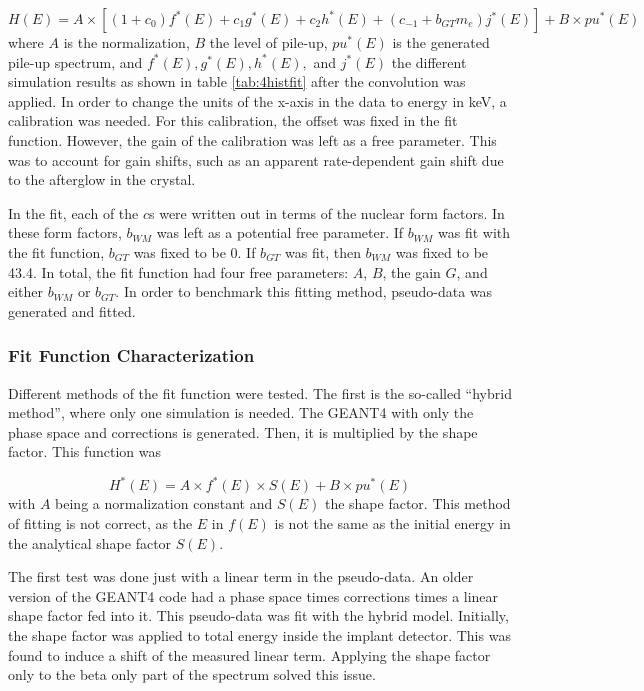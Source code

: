 \documentclass[../MaxHughesThesis.tex]{subfiles}
\begin{document}
\begin{equation}
	H(E) = A \times [( 1 + c_{0}) f^{*}(E) + c_{1}g^{*}(E) + c_{2} h^{*}(E) + (c_{-1} + b_{GT} m_{e}) j^{*}(E)] + B \times pu^{*}(E)
	\label{eq:betafit}
\end{equation}
where $A$ is the normalization, $B$ the level of pile-up, $pu^{*}(E)$ is the generated pile-up spectrum, and $f^{*}(E),g^{*}(E),h^{*}(E),$ and $j^{*}(E)$ the different simulation results as shown in table \ref{tab:4histfit} after the convolution was applied.
In order to change the units of the x-axis in the data to energy in keV, a calibration was needed.
For this calibration, the offset was fixed in the fit function.
However, the gain of the calibration was left as a free parameter.
This was to account for gain shifts, such as an apparent rate-dependent gain shift due to the afterglow in the crystal.

In the fit, each of the $c$s were written out in terms of the nuclear form factors.
In these form factors, $b_{WM}$ was left as a potential free parameter. 
If $b_{WM}$ was fit with the fit function, $b_{GT}$ was fixed to be 0. 
If $b_{GT}$ was fit, then $b_{WM}$ was fixed to be 43.4. 
In total, the fit function had four free parameters:
$A$, $B$, the gain $G$, and either $b_{WM}$ or $b_{GT}$. 
In order to benchmark this fitting method, pseudo-data was generated and fitted.

\subsubsection{Fit Function Characterization}
Different methods of the fit function were tested. 
The first is the so-called ``hybrid method'', where only one simulation is needed.
The GEANT4 with only the phase space and corrections is generated. 
Then, it is multiplied by the shape factor.
This function was 

\begin{equation}
	H^{*}(E) = A \times f^{*}(E) \times S(E) + B \times pu^{*}(E)
	\label{eq:hybridmodel}
\end{equation}
with $A$ being a normalization constant and $S(E)$ the shape factor. 
This method of fitting is not correct, as the $E$ in $f(E)$ is not the same as the initial energy in the analytical shape factor $S(E)$. 

The first test was done just with a linear term in the pseudo-data.
An older version of the GEANT4 code had a phase space times corrections times a linear shape factor fed into it.
This pseudo-data was fit with the hybrid model.
Initially, the shape factor was applied to total energy inside the implant detector.
This was found to induce a shift of the measured linear term.
Applying the shape factor only to the beta only part of the spectrum solved this issue. 
\end{document}
